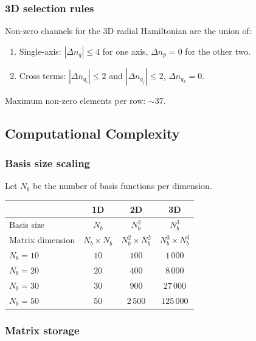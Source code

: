 \subsubsection{3D selection rules}

Non-zero channels for the 3D radial Hamiltonian are the union of:
\begin{enumerate}
    \item Single-axis: $|\Delta n_q| \leq 4$ for one axis,
          $\Delta n_p = 0$ for the other two.
    \item Cross terms: $|\Delta n_{q_i}| \leq 2$ and
          $|\Delta n_{q_j}| \leq 2$, $\Delta n_{q_k} = 0$.
\end{enumerate}
Maximum non-zero elements per row: $\sim 37$.

\subsection{Computational Complexity}\label{sec:complexity}

\subsubsection{Basis size scaling}

Let $N_b$ be the number of basis functions per dimension.

\begin{center}
\renewcommand{\arraystretch}{1.3}
\begin{tabular}{lccc}
\toprule
 & 1D & 2D & 3D \\
\midrule
Basis size & $N_b$ & $N_b^2$ & $N_b^3$ \\
Matrix dimension & $N_b \times N_b$ & $N_b^2 \times N_b^2$ & $N_b^3 \times N_b^3$ \\
\midrule
$N_b = 10$ & $10$ & $100$ & $1\,000$ \\
$N_b = 20$ & $20$ & $400$ & $8\,000$ \\
$N_b = 30$ & $30$ & $900$ & $27\,000$ \\
$N_b = 50$ & $50$ & $2\,500$ & $125\,000$ \\
\bottomrule
\end{tabular}
\end{center}

\subsubsection{Matrix storage}

